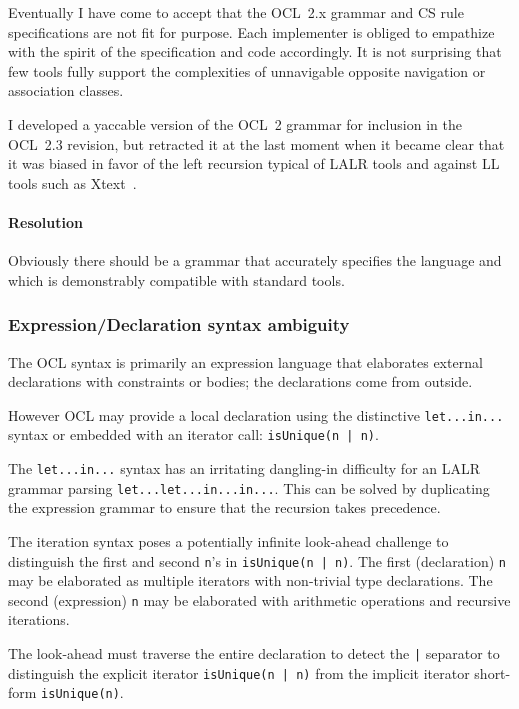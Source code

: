 \documentclass{jot}
\begin{document}
Eventually I have come to accept that the OCL~2.x grammar and CS rule specifications are not fit for purpose. Each implementer is obliged to empathize with the spirit of the specification and code accordingly. It is not surprising that few tools fully support the complexities of unnavigable opposite navigation or association classes.

I developed a yaccable version of the OCL~2 grammar for inclusion in the OCL~2.3 revision, but retracted it at the last moment when it became clear that it was biased in favor of the left recursion typical of LALR tools and against LL tools such as Xtext~\cite{Eclipse-Xtext}.

\paragraph{Resolution}

Obviously there should be a grammar that accurately specifies the language and which is demonstrably compatible with standard tools.
 
\subsubsection{Expression/Declaration syntax ambiguity}\label{Expression/Declaration syntax ambiguity}

The OCL syntax is primarily an expression language that elaborates external declarations with constraints or bodies; the declarations come from outside.

However OCL may provide a local declaration using the distinctive \verb$let...in...$ syntax or embedded with an iterator call: \verb$isUnique(n | n)$.

The \verb$let...in...$ syntax has an irritating dangling-in difficulty for an LALR grammar parsing \verb$let...let...in...in...$. This can be solved by duplicating the expression grammar to ensure that the recursion takes precedence.

The iteration syntax poses a potentially infinite look-ahead challenge to distinguish the first and second \verb$n$'s in \verb$isUnique(n | n)$. The first (declaration) \verb$n$ may be elaborated as multiple iterators with non-trivial type declarations. The second (expression) \verb$n$ may be elaborated with arithmetic operations and recursive iterations.

The look-ahead must traverse the entire declaration to detect the \verb$|$ separator to distinguish the explicit iterator \verb$isUnique(n | n)$ from the implicit iterator short-form \verb$isUnique(n)$.
\end{document}
